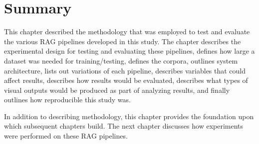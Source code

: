 \section{Summary}
This chapter described the methodology that was employed to test and evaluate the various RAG pipelines developed in this study. The chapter describes the experimental design for testing and evaluating these pipelines, defines how large a dataset was needed for training/testing, defines the corpora, outlines system architecture, lists out variations of each pipeline, describes variables that could affect results, describes how results would be evaluated, describes what types of visual outputs would be produced as part of analyzing results, and finally outlines how reproducible this study was.

In addition to describing methodology, this chapter provides the foundation upon which subsequent chapters build. The next chapter discusses how experiments were performed on these RAG pipelines.